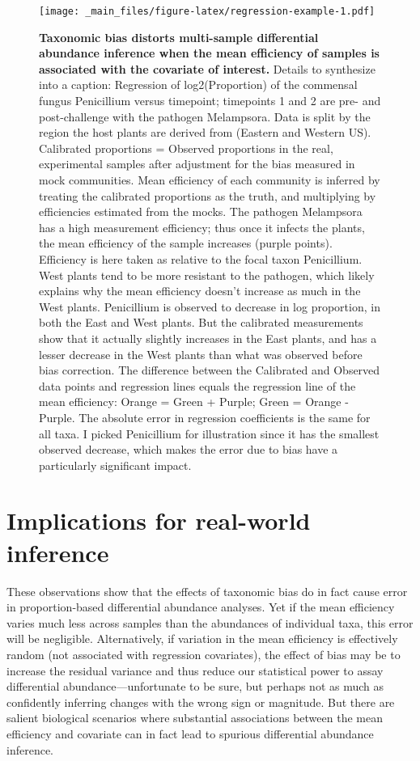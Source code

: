 \documentclass[
]{article}
\theoremstyle{definition}
\theoremstyle{definition}
\theoremstyle{definition}
\theoremstyle{definition}
\theoremstyle{remark}
\begin{document}
\begin{figure}
\centering
\texttt{[image: \_main\_files/figure-latex/regression-example-1.pdf]}
\caption{\label{fig:regression-example}\textbf{Taxonomic bias distorts multi-sample differential abundance inference when the mean efficiency of samples is associated with the covariate of interest.} Details to synthesize into a caption: Regression of log2(Proportion) of the commensal fungus Penicillium versus timepoint; timepoints 1 and 2 are pre- and post-challenge with the pathogen Melampsora. Data is split by the region the host plants are derived from (Eastern and Western US). Calibrated proportions = Observed proportions in the real, experimental samples after adjustment for the bias measured in mock communities. Mean efficiency of each community is inferred by treating the calibrated proportions as the truth, and multiplying by efficiencies estimated from the mocks. The pathogen Melampsora has a high measurement efficiency; thus once it infects the plants, the mean efficiency of the sample increases (purple points). Efficiency is here taken as relative to the focal taxon Penicillium. West plants tend to be more resistant to the pathogen, which likely explains why the mean efficiency doesn't increase as much in the West plants. Penicillium is observed to decrease in log proportion, in both the East and West plants. But the calibrated measurements show that it actually slightly increases in the East plants, and has a lesser decrease in the West plants than what was observed before bias correction. The difference between the Calibrated and Observed data points and regression lines equals the regression line of the mean efficiency: Orange = Green + Purple; Green = Orange - Purple. The absolute error in regression coefficients is the same for all taxa. I picked Penicillium for illustration since it has the smallest observed decrease, which makes the error due to bias have a particularly significant impact.}
\end{figure}



\hypertarget{implications-for-real-world-inference}{%
\section{Implications for real-world inference~}\label{implications-for-real-world-inference}}

These observations show that the effects of taxonomic bias do in fact cause error in proportion-based differential abundance analyses.
Yet if the mean efficiency varies much less across samples than the abundances of individual taxa, this error will be negligible.
Alternatively, if variation in the mean efficiency is effectively random (not associated with regression covariates), the effect of bias may be to increase the residual variance and thus reduce our statistical power to assay differential abundance---unfortunate to be sure, but perhaps not as much as confidently inferring changes with the wrong sign or magnitude.
But there are salient biological scenarios where substantial associations between the mean efficiency and covariate can in fact lead to spurious differential abundance inference.
\end{document}
